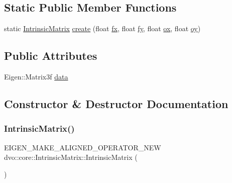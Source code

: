 \subsection*{Static Public Member Functions}
\begin{DoxyCompactItemize}
\item 
static \mbox{\hyperlink{structdvo_1_1core_1_1_intrinsic_matrix}{Intrinsic\+Matrix}} \mbox{\hyperlink{structdvo_1_1core_1_1_intrinsic_matrix_afe57d9817ec2a275482338744a80ac08}{create}} (float \mbox{\hyperlink{structdvo_1_1core_1_1_intrinsic_matrix_aa9431c46e33728102f94eed724281aea}{fx}}, float \mbox{\hyperlink{structdvo_1_1core_1_1_intrinsic_matrix_a4d96c81bec804d54ec778a66c822566d}{fy}}, float \mbox{\hyperlink{structdvo_1_1core_1_1_intrinsic_matrix_ae882a75257467c10b0ca5344410b6a3f}{ox}}, float \mbox{\hyperlink{structdvo_1_1core_1_1_intrinsic_matrix_ad0d6657452709e25bbcc7bd7b54b5d5b}{oy}})
\end{DoxyCompactItemize}
\subsection*{Public Attributes}
\begin{DoxyCompactItemize}
\item 
Eigen\+::\+Matrix3f \mbox{\hyperlink{structdvo_1_1core_1_1_intrinsic_matrix_ab76264a79c0fce5dbeb590cdbd3d6c46}{data}}
\end{DoxyCompactItemize}


\subsection{Constructor \& Destructor Documentation}
\mbox{\label{structdvo_1_1core_1_1_intrinsic_matrix_a2b25541b5d84522454f177f446c5ee2a}} 
\subsubsection{\texorpdfstring{Intrinsic\+Matrix()}{IntrinsicMatrix()}\hspace{0.1cm}{\footnotesize\ttfamily [1/2]}}
{\footnotesize\ttfamily E\+I\+G\+E\+N\+\_\+\+M\+A\+K\+E\+\_\+\+A\+L\+I\+G\+N\+E\+D\+\_\+\+O\+P\+E\+R\+A\+T\+O\+R\+\_\+\+N\+EW dvo\+::core\+::\+Intrinsic\+Matrix\+::\+Intrinsic\+Matrix (\begin{DoxyParamCaption}{ }\end{DoxyParamCaption})\hspace{0.3cm}{\ttfamily [inline]}}

